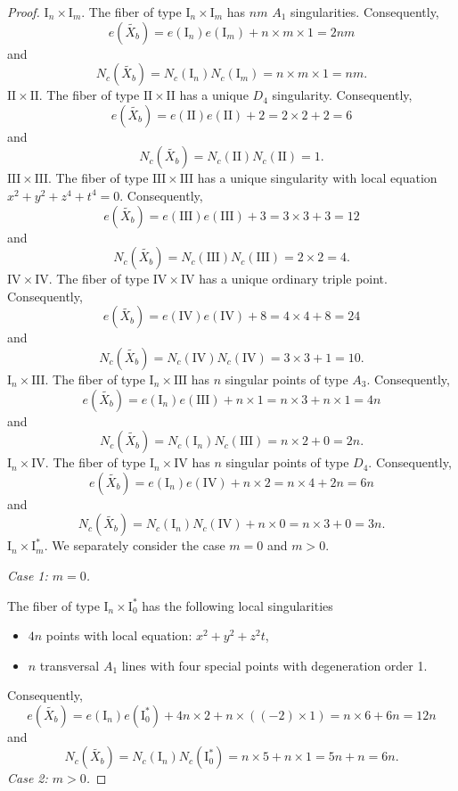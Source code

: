 \documentclass[a4paper]{amsart}
\theoremstyle{plain}
\theoremstyle{definition}
\theoremstyle{remark}
\numberwithin{equation}{section}
\begin{document}
\begin{proof}
\medskip
\noindent\emph{$\mathrm{I}_n \times \mathrm{I}_{m}$}.
The fiber of type $\mathrm{I}_n \times \mathrm{I}_{m}$ has $nm$ $A_{1}$ singularities. Consequently,
\[
e(\widetilde{X_{b}}) = e(\mathrm{I}_n)e(\mathrm{I}_{m}) + n\times m\times 1=2nm
\]
and
\[
N_{c}(\widetilde{X_{b}}) = N_{c}(\mathrm{I}_n)N_{c}(\mathrm{I}_{m}) = n\times m\times 1=nm.
\]
\medskip
\noindent\emph{$\mathrm{II} \times \mathrm{II}$}.
The fiber of type $\mathrm{II} \times \mathrm{II}$ has a unique $D_{4}$  singularity. Consequently,
\[
e(\widetilde{X_{b}}) = e(\mathrm{II})e(\mathrm{II}) + 2=2\times 2+2=6
\]
and
\[
N_{c}(\widetilde{X_{b}}) = N_{c}(\mathrm{II})N_{c}(\mathrm{II}) = 1.
\]
\medskip
\noindent\emph{$\mathrm{III} \times \mathrm{III}$}.
The fiber of type $\mathrm{III} \times \mathrm{III}$ has a unique singularity with local equation $x^{2}+y^{2}+z^{4}+t^{4}=0$. Consequently,
\[
e(\widetilde{X_{b}}) = e(\mathrm{III})e(\mathrm{III}) + 3=3\times 3+3=12
\]
and
\[
N_{c}(\widetilde{X_{b}}) = N_{c}(\mathrm{III})N_{c}(\mathrm{III}) = 2\times 2=4.
\]
\medskip
\noindent\emph{$\mathrm{IV} \times \mathrm{IV}$}.
The fiber of type $\mathrm{IV} \times \mathrm{IV}$ has a unique
ordinary triple point.
Consequently,
\[
e(\widetilde{X_{b}}) = e(\mathrm{IV})e(\mathrm{IV}) + 8=4\times 4+8=24
\]
and
\[
N_{c}(\widetilde{X_{b}}) = N_{c}(\mathrm{IV})N_{c}(\mathrm{IV}) = 3\times 3 +1 =10.
\]
\medskip
\noindent\emph{$\mathrm{I}_n \times \mathrm{III}$}.
The fiber of type $\mathrm{I}_n \times \mathrm{III}$ has $n$ singular points of type $A_{3}$. Consequently,
\[
e(\widetilde{X_{b}}) = e(\mathrm{I}_{n})e(\mathrm{III}) + n\times 1=n\times 3 + n\times 1=4n
\]
and
\[
N_{c}(\widetilde{X_{b}}) = N_{c}(\mathrm{I}_{n})N_{c}(\mathrm{III}) = n\times 2 + 0 = 2n.
\]
\medskip
\noindent\emph{$\mathrm{I}_n \times \mathrm{IV}$}.
The fiber of type $\mathrm{I}_n \times \mathrm{IV}$ has $n$ singular points of type $D_{4}$. Consequently,
\[
e(\widetilde{X_{b}}) = e(\mathrm{I}_{n})e(\mathrm{IV}) + n\times 2=n\times 4 + 2n=6n
\]
and
\[
N_{c}(\widetilde{X_{b}}) = N_{c}(\mathrm{I}_{n})N_{c}(\mathrm{IV}) + n\times 0  = n\times 3 + 0 = 3n.
\]
\medskip
\noindent\emph{$\mathrm{I}_n \times \mathrm{I}_{m}^{*}$}.
We separately consider the case $m=0$ and $m>0$.

\medskip
\noindent
\emph{Case 1: $m=0$.}

The fiber of type $\mathrm{I}_n \times \mathrm{I}_{0}^{*}$ has the following local singularities
\begin{itemize}
	\item [] $4n$ points with local equation: $x^{2}+y^{2}+z^{2}t$,
	\item [] $n$ transversal $A_{1}$ lines with four  special points with degeneration order 1.
\end{itemize}
Consequently,
\[
e(\widetilde{X_{b}}) = e(\mathrm{I}_n)e(\mathrm{I}_{0}^{*}) + 4n\times2 + n\times((-2) \times 1) = n\times 6 + 6n = 12n
\]
and
\[
N_{c}(\widetilde{X_{b}}) = N_{c}(\mathrm{I}_{n})N_{c}(\mathrm{I}_{0}^{*}) = n\times 5 + n \times 1 =5n + n = 6n.
\]
\medskip
\noindent
\emph{Case 2: $m>0$.}


\end{proof}
\end{document}
